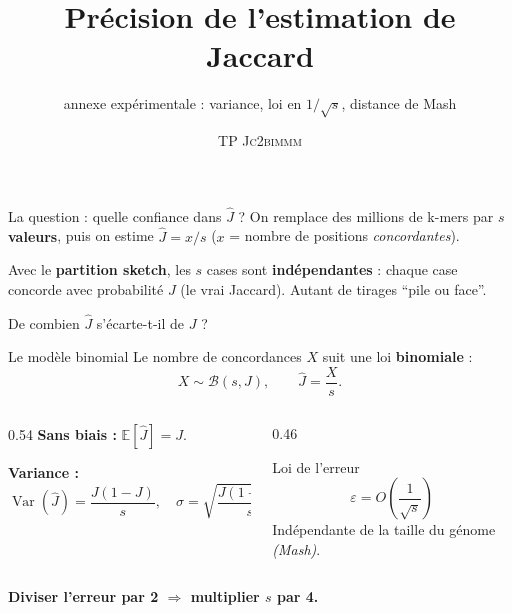\documentclass[aspectratio=169,11pt]{beamer}
\title{Précision de l'estimation de Jaccard}
\subtitle{annexe expérimentale : variance, loi en $1/\sqrt{s}$, distance de Mash}
\author{TP \textsc{Jc2bimmm}}
\date{}
\institute{d'après la revue de C.~Marchet et les articles cités}
\begin{document}
\maketitle

\begin{frame}{La question : quelle confiance dans $\hat J$ ?}
  \footnotesize
  On remplace des millions de k-mers par \textbf{$s$ valeurs}, puis on estime
  $\hat J = x/s$ ($x$ = nombre de positions \emph{concordantes}).
  \medskip

  Avec le \textbf{partition sketch}, les $s$ cases sont \textbf{indépendantes} :
  chaque case concorde avec probabilité $J$ (le vrai Jaccard). Autant de tirages
  \enquote{pile ou face}.

  \begin{center}
  \end{center}
  \centering\footnotesize\textcolor{cGray}{De combien $\hat J$ s'écarte-t-il de $J$ ?}
\end{frame}

\begin{frame}{Le modèle binomial}
  \footnotesize
  Le nombre de concordances $X$ suit une loi \textbf{binomiale} :
  \[ X \sim \mathcal{B}(s, J), \qquad \hat J = \frac{X}{s}. \]
  \begin{columns}[T]
    \begin{column}{0.54\textwidth}
      \textbf{Sans biais :} $\mathbb{E}[\hat J] = J$.
      \medskip

      \textbf{Variance :}
      \[ \operatorname{Var}(\hat J) = \frac{J(1-J)}{s},
         \quad \sigma = \sqrt{\frac{J(1-J)}{s}}. \]
    \end{column}
    \begin{column}{0.46\textwidth}
      \begin{alertblock}{Loi de l'erreur}
        \footnotesize
        \[ \varepsilon = O\!\left(\frac{1}{\sqrt{s}}\right) \]
        Indépendante de la taille du génome \textit{(Mash)}.
      \end{alertblock}
    \end{column}
  \end{columns}
  \medskip
  \centering
  \textcolor{cGreen}{\textbf{Diviser l'erreur par 2 $\Rightarrow$ multiplier $s$ par 4.}}
\end{frame}
\end{document}
